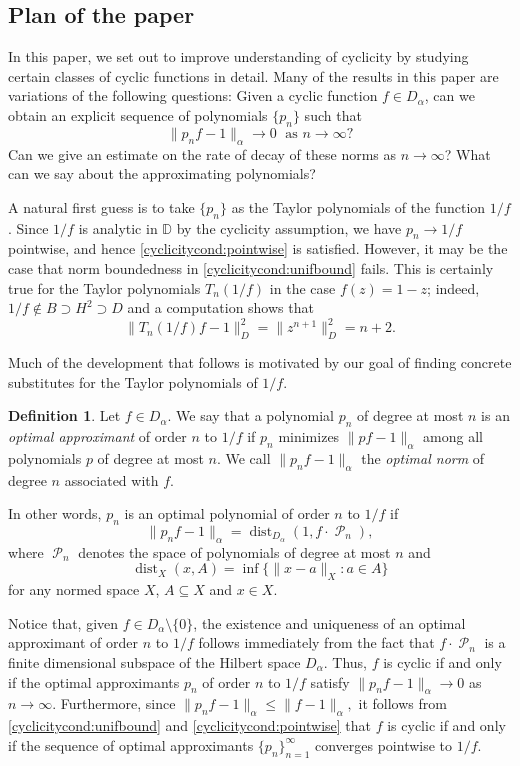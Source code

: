 \documentclass[11 pt,reqno]{amsart}
\theoremstyle{definition}
\newtheorem{defn}[thm]{Definition}
\theoremstyle{remark}
\numberwithin{equation}{section} \numberwithin{figure}{section}
\newcommand{\DD}{{\mathbb D}}
\DeclareMathOperator{\Pol}{{\mathcal P}}
\DeclareMathOperator{\dist}{dist}
\begin{document}
\subsection{Plan of the paper}\label{s-Plan}

In this paper, we set out to improve understanding of cyclicity
by studying certain classes of cyclic functions in detail.  Many of the results
in this paper are variations of the following questions:  Given a cyclic
function $f \in D_{\alpha}$,
can we obtain an explicit sequence of polynomials $\{p_n\}$ such that
\[\|p_nf-1\|_{\alpha}\to 0\;\text{ as }n\to\infty?\]
Can we give an estimate on the rate of decay of these norms as $n
\rightarrow \infty$? What can we say about the approximating
polynomials?

A natural first guess is to take $\{p_n\}$ as the Taylor polynomials
of the function $1/f$. Since $1/f$ is analytic in $\DD$ by the
cyclicity assumption, we have $p_n\rightarrow 1/f$ pointwise, and
hence \eqref{cyclicitycond:pointwise} is satisfied. However, it may
be the case that norm boundedness
in \eqref{cyclicitycond:unifbound} fails.  This is certainly
true for the Taylor polynomials $T_n(1/f)$ in the case $f(z)=1-z$; indeed, $1/f\notin B\supset H^2\supset D$ and a computation
shows that
\[\|T_n(1/f)f-1\|^2_{D}=\|z^{n+1}\|^2_{D}=n+2.\]

Much of the development that follows is motivated by our goal of
finding concrete substitutes for the Taylor polynomials of $1/f$.

\begin{defn}
Let $f \in D_\alpha$. We say that a polynomial $p_n$ of degree at most $n$
is an {\it optimal approximant} of order $n$ to $1/f$ if $p_n$ minimizes
$\|p f-1\|_\alpha$ among all polynomials $p$ of degree at most $n$.  We call
$\|p_{n}f-1\|_{\alpha}$ the \emph{optimal norm} of degree $n$ associated with $f$.
\end{defn}

In other words, $p_{n}$ is an optimal polynomial of order $n$ to $1/f$ if
\[  \|p_{n}f-1\|_{\alpha}=\dist_{D_{\alpha}}(1,f\cdot\Pol_{n}), \]
where $\Pol_{n}$ denotes the space of polynomials of degree at most $n$ and
\[  \dist_{X}(x,A)=\inf\{\|x-a\|_X: a\in A\}    \]
for any normed space $X$, $A\subseteq X$ and $x\in X$.

Notice that, given $f\in D_{\alpha}\setminus\{0\}$, the existence and uniqueness of
an optimal approximant of order $n$ to $1/f$ follows immediately from the fact that
$f\cdot\Pol_{n}$ is a finite dimensional subspace of the Hilbert space $D_{\alpha}$.
Thus, $f$ is cyclic if and only if the optimal approximants $p_n$ of order $n$ to $1/f$
satisfy $\|p_n f -1\|_\alpha\rightarrow 0$ as $n\rightarrow\infty$.  Furthermore, since
$\|p_n f-1\|_\alpha \leq \|f-1\|_\alpha,$ it follows from
\eqref{cyclicitycond:unifbound} and \eqref{cyclicitycond:pointwise} that $f$ is cyclic
if and only if the sequence of optimal approximants $\{p_n\}_{n=1}^{\infty}$ converges pointwise to $1/f$.
\end{document}

